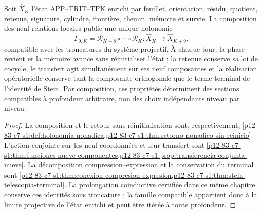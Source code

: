 \begin{theorem}
\label{thm:nucleo-continuidad-conexion-nonadica-conjunta}
Soit \(\widehat X_K\) l'état APP--TRIT--TPK enrichi par feuillet,
orientation, résidu, quotient, retenue, signature, cylindre, frontière, chemin,
mémoire et survie. La composition des neuf relations locales
publie une unique holonomie
\[
 \Gamma_{9,K}=\mathcal R_{K+8}\circ\cdots\circ\mathcal R_K
 :\widehat X_K\longrightarrow\widehat X_{K+9},
\]
compatible avec les troncatures du système projectif. À chaque tour, la phase revient
et la mémoire avance sans réinitialiser l'état ; la retenue conserve
sa loi de cocycle, le transfert agit simultanément sur ses neuf
composantes et la réalisation opératorielle conserve tant la composante
orthogonale que le terme terminal de l'identité de Stein. Par composition,
ces propriétés déterminent des sections compatibles à profondeur arbitraire,
non des choix indépendants niveau par niveau.
\end{theorem}

\begin{proof}
La composition et le retour sans réinitialisation sont, respectivement,
\cref{p12-83-c7-s1:def:holonomia-nonadica,p12-83-c7-s1:thm:retorno-nonadico-sin-reinicio}.
L'action conjointe sur les neuf coordonnées et leur transfert sont
\cref{p12-83-c7-s1:thm:funciones-nueve-componentes,p12-83-c7-s1:prop:transferencia-conjunta-nueve}.
La décomposition compression--expression et la conservation du terminal sont
\cref{p12-83-c7-s1:thm:conexion-compresion-expresion,p12-83-c7-s1:thm:stein-telescopia-terminal}.
La prolongation coinductive certifiée dans ce même chapitre conserve ces
identités sous troncature ; la famille compatible appartient donc à la
limite projective de l'état enrichi et peut être itérée à toute profondeur.
\end{proof}
